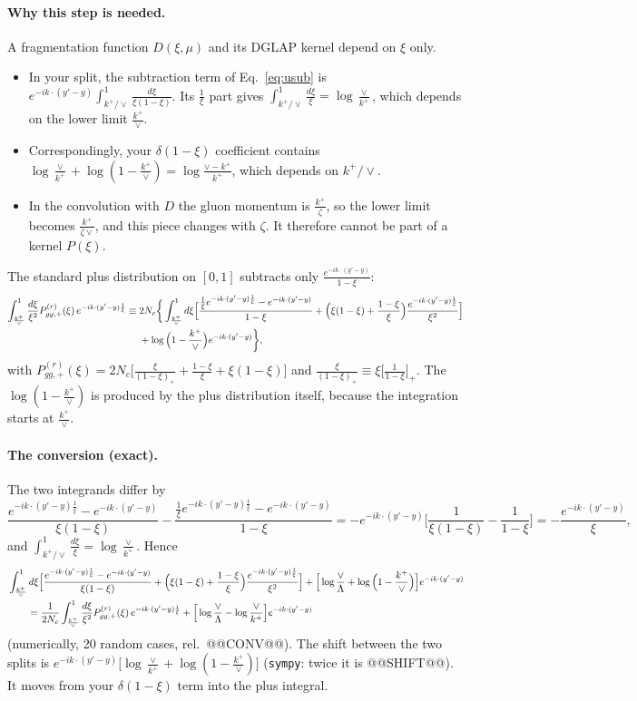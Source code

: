 \documentclass[10pt]{article}
\numberwithin{equation}{section}
\newcommand{\ph}{e^{-ik\cdot(y'-y)\frac{1}{\xi}}}
\newcommand{\phone}{e^{-ik\cdot(y'-y)}}
\begin{document}
\paragraph{Why this step is needed.} A fragmentation function $D(\xi,\mu)$ and its DGLAP kernel depend on $\xi$ only.
\begin{itemize}
\item In your split, the subtraction term of Eq.~\eqref{eq:usub} is $\phone\int_{k^+/\vee}^1\frac{d\xi}{\xi(1-\xi)}$. Its $\frac1\xi$ part gives $\int_{k^+/\vee}^1\frac{d\xi}{\xi}=\log\frac{\vee}{k^+}$, which depends on the lower limit $\frac{k^+}{\vee}$.
\item Correspondingly, your $\delta(1-\xi)$ coefficient contains $\log\frac{\vee}{k^+}+\log(1-\frac{k^+}{\vee})=\log\frac{\vee-k^+}{k^+}$, which depends on $k^+/\vee$.
\item In the convolution with $D$ the gluon momentum is $\frac{k^+}{\zeta}$, so the lower limit becomes $\frac{k^+}{\zeta\vee}$, and this piece changes with $\zeta$. It therefore cannot be part of a kernel $P(\xi)$.
\end{itemize}
The standard plus distribution on $[0,1]$ subtracts only $\frac{\phone}{1-\xi}$:
\begin{align}
\int_{\frac{k^+}{\vee}}^1\frac{d\xi}{\xi^2}P^{(r)}_{gg,+}(\xi)\,\ph\equiv{}&2N_c\bigg\{\int_{\frac{k^{+}}{\vee}}^{1}d\xi\Big[\frac{\frac1\xi\ph-\phone}{1-\xi}+\Big(\xi(1-\xi)+\frac{1-\xi}{\xi}\Big)\frac{\ph}{\xi^2}\Big]\notag\\
&+\log\Big(1-\frac{k^+}{\vee}\Big)\phone\bigg\},
\label{eq:std}
\end{align}
with $P^{(r)}_{gg,+}(\xi)=2N_c\big[\frac{\xi}{(1-\xi)_+}+\frac{1-\xi}{\xi}+\xi(1-\xi)\big]$ and $\frac{\xi}{(1-\xi)_+}\equiv\xi\big[\frac{1}{1-\xi}\big]_+$. The $\log(1-\frac{k^+}{\vee})$ is produced by the plus distribution itself, because the integration starts at $\frac{k^+}{\vee}$.

\paragraph{The conversion (exact).} The two integrands differ by
\begin{equation*}
\frac{\ph-\phone}{\xi(1-\xi)}-\frac{\frac1\xi\ph-\phone}{1-\xi}=-\phone\Big[\frac{1}{\xi(1-\xi)}-\frac{1}{1-\xi}\Big]=-\frac{\phone}{\xi},
\end{equation*}
and $\int_{k^+/\vee}^1\frac{d\xi}{\xi}=\log\frac{\vee}{k^+}$. Hence
\begin{align}
&\int_{\frac{k^{+}}{\vee}}^{1}d\xi\Big[\frac{\ph-\phone}{\xi(1-\xi)}+\Big(\xi(1-\xi)+\frac{1-\xi}{\xi}\Big)\frac{\ph}{\xi^2}\Big]+\Big[\log\frac{\vee}{\Lambda}+\log\Big(1-\frac{k^{+}}{\vee}\Big)\Big]\phone\notag\\
&\qquad=\frac{1}{2N_c}\int_{\frac{k^+}{\vee}}^1\frac{d\xi}{\xi^2}P^{(r)}_{gg,+}(\xi)\,\ph+\Big[\log\frac{\vee}{\Lambda}-\log\frac{\vee}{k^+}\Big]\phone
\label{eq:conv}
\end{align}
(numerically, 20 random cases, rel.\ @@CONV@@). The shift between the two splits is $\phone\big[\log\frac{\vee}{k^+}+\log(1-\frac{k^+}{\vee})\big]$ (\texttt{sympy}: twice it is @@SHIFT@@). It moves from your $\delta(1-\xi)$ term into the plus integral.
\end{document}
